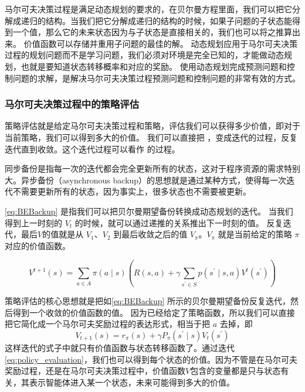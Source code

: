 马尔可夫决策过程是满足动态规划的要求的，在贝尔曼方程里面，我们可以把它分解成递归的结构。当我们把它分解成递归的结构的时候，如果子问题的子状态能得到一个值，那么它的未来状态因为与子状态是直接相关的，我们也可以将之推算出来。
价值函数可以存储并重用子问题的最佳的解。
动态规划应用于马尔可夫决策过程的规划问题而不是学习问题，我们必须对环境是完全已知的，才能做动态规划，也就是要知道状态转移概率和对应的奖励。
使用动态规划完成预测问题和控制问题的求解，是解决马尔可夫决策过程预测问题和控制问题的非常有效的方式。

\subsubsection{马尔可夫决策过程中的策略评估} 

策略评估就是给定马尔可夫决策过程和策略，评估我们可以获得多少价值，即对于当前策略，我们可以得到多大的价值。
我们可以直接把 ，变成迭代的过程，反复迭代直到收敛。这个迭代过程可以看作 的过程。

\begin{tcolorbox}[colframe=blue!25,colback=blue!10]
同步备份是指每一次的迭代都会完全更新所有的状态，这对于程序资源的需求特别大。异步备份（asynchronous backup）的思想就是通过某种方式，使得每一次迭代不需要更新所有的状态，因为事实上，很多状态也不需要被更新。
\end{tcolorbox}

 \eqref{eq:BEBackup} 是指我们可以把贝尔曼期望备份转换成动态规划的迭代。
 当我们得到上一时刻的 $V_t$ 的时候，就可以通过递推的关系推出下一时刻的值。
 反复迭代，最后$V$的值就是从 $V_1$、$V_2$ 到最后收敛之后的值 $V_{\pi}$。$V_{\pi}$ 就是当前给定的策略 $\pi$ 对应的价值函数。

 \begin{equation}
  V^{t+1}(s)=\sum_{a \in A} \pi(a \mid s)\left(R(s, a)+\gamma \sum_{s^{\prime} \in S} p\left(s^{\prime} \mid s, a\right) V^{t}\left(s^{\prime}\right)\right) 
  \label{eq:BEBackup}
\end{equation}


策略评估的核心思想就是把如\eqref{eq:BEBackup} 所示的贝尔曼期望备份反复迭代，然后得到一个收敛的价值函数的值。
因为已经给定了策略函数，所以我们可以直接把它简化成一个马尔可夫奖励过程的表达形式，相当于把 $a$ 去掉，即
\begin{equation}
  V_{t+1}(s)=r_{\pi}(s)+\gamma P_{\pi}\left(s^{\prime} \mid s\right) V_{t}\left(s^{\prime}\right)
  \label{eq:policy_evaluation}
\end{equation}
这样迭代的式子中就只有价值函数与状态转移函数了。通过迭代\eqref{eq:policy_evaluation}，我们也可以得到每个状态的价值。因为不管是在马尔可夫奖励过程，还是在马尔可夫决策过程中，价值函数$V$包含的变量都是只与状态有关，其表示智能体进入某一个状态，未来可能得到多大的价值。

